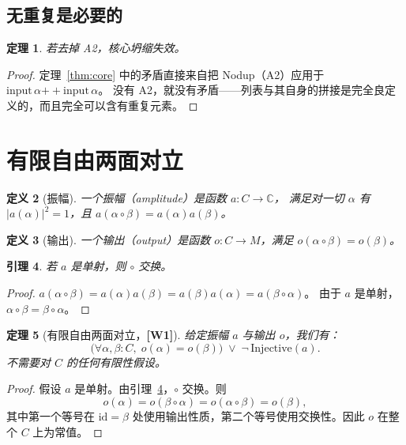 \documentclass[11pt]{ctexart}
\newcommand{\wone}[1]{\textcolor{wcolor}{\textbf{[#1]}}}
\newtheorem{theorem}{定理}
\newtheorem{lemma}[theorem]{引理}
\newtheorem{definition}[theorem]{定义}
\begin{document}
\subsection{无重复是必要的}

\begin{theorem}
\label{thm:nodup-necessary}
若去掉 A2，核心坍缩失效。
\end{theorem}

\begin{proof}
定理~\ref{thm:core} 中的矛盾直接来自把 Nodup（A2）应用于
$\mathrm{input}\,\alpha \mathbin{+\!+} \mathrm{input}\,\alpha$。
没有 A2，就没有矛盾——列表与其自身的拼接是完全良定义的，而且完全可以含有重复元素。
\end{proof}

\section{有限自由两面对立}
\label{sec:dichotomy}

\begin{definition}[振幅]
一个\emph{振幅}（amplitude）是函数 $a : C \to \mathbb{C}$，
满足对一切 $\alpha$ 有 $|a(\alpha)|^2 = 1$，且
$a(\alpha \circ \beta) = a(\alpha) a(\beta)$。
\end{definition}

\begin{definition}[输出]
一个\emph{输出}（output）是函数 $o : C \to M$，满足
$o(\alpha \circ \beta) = o(\beta)$。
\end{definition}

\begin{lemma}
\label{lem:comm}
若 $a$ 是单射，则 $\circ$ 交换。
\end{lemma}

\begin{proof}
$a(\alpha \circ \beta) = a(\alpha) a(\beta)
  = a(\beta) a(\alpha) = a(\beta \circ \alpha)$。
由于 $a$ 是单射，$\alpha \circ \beta = \beta \circ \alpha$。
\end{proof}

\begin{theorem}[有限自由两面对立，\wone{W1}]
\label{thm:dichotomy}
给定振幅 $a$ 与输出 $o$，我们有：
\[
\bigl(\forall \alpha, \beta : C,\; o(\alpha) = o(\beta)\bigr)
\;\vee\;
\neg\,\mathrm{Injective}(a).
\]
不需要对 $C$ 的任何有限性假设。
\end{theorem}

\begin{proof}
假设 $a$ 是单射。由引理~\ref{lem:comm}，$\circ$
交换。则
\[
o(\alpha) = o(\beta \circ \alpha)
  = o(\alpha \circ \beta)
  = o(\beta),
\]
其中第一个等号在 $\mathrm{id} = \beta$ 处使用输出性质，第二个等号使用交换性。因此 $o$ 在整个 $C$ 上为常值。
\end{proof}
\end{document}
